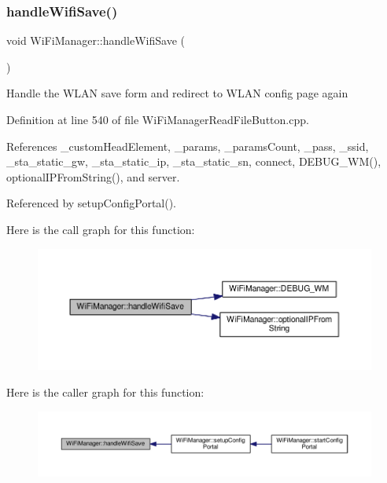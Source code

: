 \subsubsection{\texorpdfstring{handle\+Wifi\+Save()}{handleWifiSave()}}
{\footnotesize\ttfamily void Wi\+Fi\+Manager\+::handle\+Wifi\+Save (\begin{DoxyParamCaption}{ }\end{DoxyParamCaption})\hspace{0.3cm}{\ttfamily [private]}}

Handle the W\+L\+AN save form and redirect to W\+L\+AN config page again 

Definition at line 540 of file Wi\+Fi\+Manager\+Read\+File\+Button.\+cpp.



References \+\_\+custom\+Head\+Element, \+\_\+params, \+\_\+params\+Count, \+\_\+pass, \+\_\+ssid, \+\_\+sta\+\_\+static\+\_\+gw, \+\_\+sta\+\_\+static\+\_\+ip, \+\_\+sta\+\_\+static\+\_\+sn, connect, D\+E\+B\+U\+G\+\_\+\+W\+M(), optional\+I\+P\+From\+String(), and server.



Referenced by setup\+Config\+Portal().

Here is the call graph for this function\+:\nopagebreak
\begin{figure}[H]
\begin{center}
\leavevmode
\includegraphics[width=350pt]{d4/dc8/class_wi_fi_manager_a2a8c2b60aa86dfdeab8a1a90f7122dc7_cgraph}
\end{center}
\end{figure}
Here is the caller graph for this function\+:\nopagebreak
\begin{figure}[H]
\begin{center}
\leavevmode
\includegraphics[width=350pt]{d4/dc8/class_wi_fi_manager_a2a8c2b60aa86dfdeab8a1a90f7122dc7_icgraph}
\end{center}
\end{figure}
\mbox{\label{class_wi_fi_manager_ac35e46661f8a209d84bba62d9aa43a35}} 
